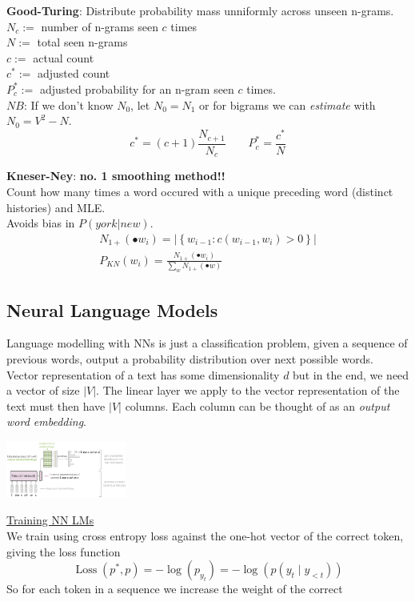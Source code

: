 \documentclass[8pt]{extarticle} %
\begin{document}
\begin{multicols*}{3}
\textbf{Good-Turing}: Distribute probability mass unniformly across unseen n-grams. \\
$N_c:=$ number of n-grams seen $c$ times\\
$N:=$ total seen n-grams\\
${c}:=$ actual count\\
$c^*:=$ adjusted count\\
$P^*_c:=$ adjusted probability for an n-gram seen $c$ times.\\
$NB$: If we don't know $N_0$, let $N_0=N_1$ or for bigrams we can \textit{estimate} with $N_0=V^2-N$. 
    $$c^*=(c+1)\frac{N_{c+1}}{N_{c}}\qquad P^{*}_c=\frac{c^{*}}{N}$$

\textbf{Kneser-Ney}: \textbf{no. 1 smoothing method!!}\\
Count how many times a word occured with a unique preceding word (distinct histories) and MLE. \\
Avoids bias in $P(york|new)$.
$$
\begin{gathered}
N_{1+}\left(\bullet w_i\right)=\left|\left\{w_{i-1}: c\left(w_{i-1}, w_i\right)>0\right\}\right| \\
P_{K N}\left(w_i\right)=\frac{N_{1+}\left(\bullet w_i\right)}{\sum_w N_{1+}(\bullet w)}
\end{gathered}
$$

\subsection*{Neural Language Models}
Language modelling with NNs is just a classification problem, given a sequence of previous words, output a probability distribution over next possible words.\\
Vector representation of a text has some dimensionality $d$ but in the end, we need a vector of size $|V|$. The linear layer we apply to the vector representation of the text must then have $|V|$ columns. Each column can be thought of as an \textit{output word embedding}. 
\begin{center}
    \includegraphics[width=0.3\textwidth]{media/nn-lm.png}
\end{center}

\underline{Training NN LMs}\\
We train using cross entropy loss against the one-hot vector of the correct token, giving the loss function
$$\operatorname{Loss}\left(p^*, p\right)=-\log \left(p_{y_t}\right)=-\log \left(p\left(y_t \mid y_{<t}\right)\right)$$
So for each token in a sequence we increase the weight of the correct\\ 


\end{multicols*}
\end{document}
